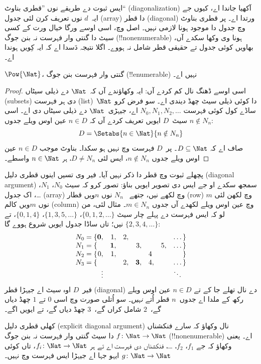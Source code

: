\documentclass[../../../include/open-logic-section]{subfiles}
\begin{document}
\begin{explain}
ایس ثبوت دے طریقے نوں ”قطری بناوٹ“ (diagonalization) آکھیا جاندا اے،
کیوں جے ایہ~$d$ نوں تعریف کرن لئی جدول (array) دا قطر (diagonal)
ورتدا اے۔ پر قطری بناوٹ وچ جدول دا موجود ہونا لازمی نہیں۔ اصل وچ،
اسی اوسے ورگا خیال ورت کے کسی سیٹ دا گنتی وار فہرست نہ بنن جوگ
(!!{nonenumerable}) ہونا وی وکھا سکدے آں، بھاویں کوئی جدول تے حقیقی
قطر شامل نہ ہووے۔ اگلا نتیجہ دَسدا اے کہ ایہ کِویں ہوندا اے۔
\end{explain}

\begin{thm}
$\Pow{\Nat}$، گنتی وار فہرست بنن جوگ (!!{enumerable}) نہیں اے۔
\end{thm}

\begin{proof}
اسی اوسے ڈھنگ نال کم کردے آں: ایہ وکھاؤندے آں کہ~$\Nat$ دے ذیلی
سیٹاں (subsets) دی ہر فہرست (list)~$\Nat$ دا کوئی ذیلی سیٹ چھڈ دیندی
اے۔ سو فرض کرو ساڈے کول کوئی فہرست $N_0, N_1, N_2, \ldots$ اے،
جیہڑی~$\Nat$ دے ذیلی سیٹاں دی اے۔ اسی سیٹ~$D$ ایویں تعریف کردے آں
کہ $n \in D$ عین اوس ویلے جدوں $n \notin N_{n}$:
\[
D = \Setabs{n \in \Nat}{n \notin N_n}
\]
صاف اے کہ $D\subseteq \Nat$۔ پر~$D$ فہرست وچ نہیں ہو سکدا۔ بناوٹ
موجب $n \in D$ عین اوس ویلے جدوں $n\notin N_n$، ایس لئی
$D \neq N_n$، ہر $n \in \Nat$ واسطے۔
\end{proof}

\begin{explain}
پچھلے ثبوت وچ قطر دا ذکر نہیں آیا۔ فیر وی تسیں اینوں قطری دلیل
(diagonal argument) سمجھ سکدے او جے ایس دی تصویر ایویں بناؤ: تصور
کرو کہ سیٹ $N_0$، $N_1$، \dots، اک جدول (array) وچ لکھے نیں، جتھے
~$N_n$ نوں $n$ویں قطار (row) وچ لکھن لئی $m$ نوں $m$ویں کالم
(column) وچ عین اوس ویلے لکھدے آں جدوں $m \in N_n$۔ مثال لئی، من لو
کہ ایس فہرست دے پہلے چار سیٹ
$\{0,1,2,\dots\}$، $\{1, 3, 5, \dots\}$، $\{0,1,4\}$، تے
$\{2,3,4,\dots\}$ نیں؛ تاں ساڈا جدول ایویں شروع ہووے گا:
\[
\begin{array}{r@{}rrrrrrr}
  N_0 = \{ & \mathbf{0}, & 1, & 2, & & & & \dots\}\\
  N_1 = \{ &  & \mathbf{1}, &  & 3, &  & 5, & \dots\}\\
  N_2 = \{ & 0, & 1, &  &  & 4\phantom{,} &  & \}\\
  N_3 = \{ &  &  & 2, & \mathbf{3}, & 4, & & \dots\}\\
  &\vdots & & & & & & \ddots\phantom{\}}
  \end{array}
\]
فیر~$D$ اوہ سیٹ اے جیہڑا قطر (diagonal) دے نال تھلے جا کے تے
$n \in D$ عین اوس ویلے رکھ کے ملدا اے جدوں~$n$ قطر اُتے
\emph{نہیں}۔ سو اُتلی صورت وچ اسی $0$ تے $1$ چھڈ دیاں گے،~$2$ شامل
کراں گے،~$3$ چھڈ دیاں گے، تے ایویں اگے۔
\end{explain}

\begin{prob}
کھلی قطری دلیل (explicit diagonal argument) نال وکھاؤ کہ سارے فنکشناں
$f \colon \Nat \to \Nat$ دا سیٹ گنتی وار فہرست نہ بنن جوگ
(!!{nonenumerable}) اے۔ یعنی وکھاؤ کہ جے $f_1$، $f_2$، \dots،
فنکشناں دی فہرست اے تے ہر $f_i\colon \Nat \to \Nat$، تاں کوئی
$g \colon \Nat \to \Nat$ ایہو جہا اے جیہڑا ایس فہرست وچ نہیں۔
\end{prob}
\end{document}
